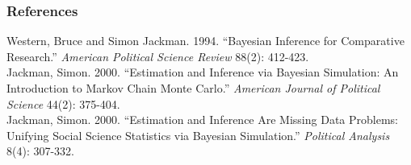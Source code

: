 \documentclass{beamer}
\begin{document}
\begin{frame}
\frametitle{References}
\pause
\begin{figure}[!htp]
\begin{center}
\pause
{}
\pause
{}
\end{center}
\end{figure}
\pause
\tiny
Western, Bruce and Simon Jackman.  1994.  ``Bayesian Inference for
Comparative Research.''  {\it American Political Science Review}
88(2): 412-423. \\
\bigskip
Jackman, Simon.  2000.  ``Estimation and Inference via Bayesian
Simulation: An Introduction to Markov Chain Monte Carlo.'' {\it
American Journal of Political Science} 44(2): 375-404. \\
\bigskip
Jackman, Simon.  2000. ``Estimation and Inference Are Missing Data
Problems: Unifying Social Science Statistics via Bayesian
Simulation.''  {\it Political Analysis} 8(4): 307-332. \\
\normalsize
\end{frame}
\end{document}

